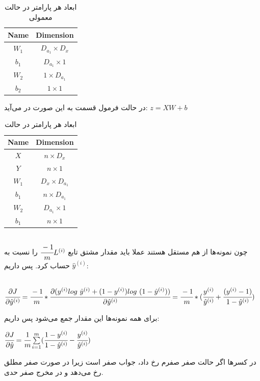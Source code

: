 \documentclass[a4paper,14pt]{extarticle}
\begin{document}
\subsection{}
\begin{table}[h]
	\centering
	\caption{ابعاد هر پارامتر در حالت معمولی}
	\begin{latin}
		\begin{tabular}{|c|c|}
			\hline
			Name & Dimension \\
			\hline
			$W_1$ & $D_{a_1} \times D_x$ \\
			$b_1$ & $D_{a_1} \times 1$ \\
			$W_2$ & $1 \times D_{a_1}$ \\
			$b_2$ & $1 \times 1$ \\
			\hline
		\end{tabular}
	\end{latin}
\end{table}
در حالت  فرمول قسمت 
به این صورت در می‌آید:
$
z = XW + b
$
\begin{table}[h]
	\centering
	\caption{ابعاد هر پارامتر در حالت }
	\begin{latin}
		\begin{tabular}{|c|c|}
			\hline
			Name & Dimension \\
			\hline
			$X$ & $n \times D_x$ \\
			$Y$ & $n \times 1$ \\
			$W_1$ & $D_x \times D_{a_1}$\\
			$b_1$ & $ n \times  D_{a_1}$\\
			$W_2$ & $D_{a_1} \times 1$\\
			$b_1$ & $ n \times  1$\\
			\hline
		\end{tabular}
	\end{latin}
\end{table}
\subsection{}
چون نمونه‌ها از هم مستقل هستند عملا باید مقدار مشتق تابع 
$
\cfrac{-1}{m}L^{(i)}
$
را نسبت به 
$
\hat{y}^{(i)}
$
حساب کرد. پس داریم:
\begin{latin}
	~\\
	$
	\cfrac{\partial J}{\partial \hat{y}^{(i)}} = \cfrac{-1}{m} *\cfrac{\partial (
		y^{(i)} log\ \hat{y}^{(i)} + (1 - y^{(i)})log\ (1 - \hat{y}^{(i)})
		)}{\partial \hat{y}^{(i)}}
		\\
		=
		\cfrac{-1}{m}
		*
		(
		\cfrac{y^{(i)} }{\hat{y}^{(i)}}
		+
		\cfrac{(y^{(i)} - 1)}{1 - \hat{y}^{(i)}}
		)
	$
\end{latin}
برای همه نمونه‌ها این مقدار جمع می‌شود پس داریم:
\begin{latin}
	$
	\cfrac{\partial J}{\partial \hat{y}} = \cfrac{1}{m } \sum\limits_{i = 1}^m (\cfrac{1 - y^{(i)}}{1 - \hat{y}^{(i)}} - \cfrac{y^{(i)}}{\hat{y}^{(i)}})
	$
\end{latin}
در کسرها اگر حالت صفر صفرم رخ داد، جواب صفر است زیرا در صورت صفر مطلق رخ می‌دهد و در مخرج صفر حدی.
\end{document}
